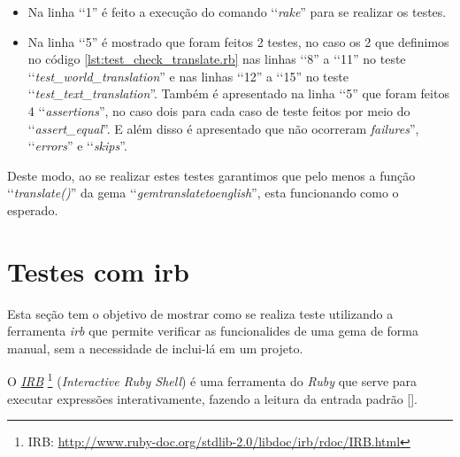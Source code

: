 \begin{itemize}

 \item Na linha ‘‘1'' é feito a execução do comando ‘‘\emph{rake}'' para se realizar os testes.

 \item Na linha ‘‘5'' é mostrado que foram feitos 2 testes, no caso os 2 que definimos no código
 \ref{lst:test_check_translate.rb} nas linhas ‘‘8'' a ‘‘11'' no teste ‘‘\emph{test\_world\_translation}''
 e nas linhas ‘‘12'' a ‘‘15'' no teste ‘‘\emph{test\_text\_translation}''. Também é apresentado na
 linha ‘‘5'' que foram feitos 4 ‘‘\emph{assertions}'', no caso dois para cada caso de teste feitos por
 meio do ‘‘\emph{assert\_equal}''. E além disso é apresentado que não ocorreram  \emph{failures}'',
 ‘‘\emph{errors}'' e ‘‘\emph{skips}''.

\end{itemize}

Deste modo, ao se realizar estes testes garantimos que pelo menos a função ‘‘\emph{translate()}'' da gema
‘‘\emph{gemtranslatetoenglish}'', esta funcionando como o esperado.


\section{Testes com irb}
\label{section:teste_com_irb}


Esta seção tem o objetivo de mostrar como se realiza teste utilizando a ferramenta \emph{irb} que permite
verificar as funcionalides de uma gema de forma manual, sem a necessidade de inclui-lá em um projeto.

O \emph{\href{http://www.ruby-doc.org/stdlib-2.0/libdoc/irb/rdoc/IRB.html}{IRB}} 
\footnote{IRB: \url{http://www.ruby-doc.org/stdlib-2.0/libdoc/irb/rdoc/IRB.html}}
(\emph{Interactive Ruby Shell}) é uma ferramenta do \emph{Ruby} que serve para executar expressões
interativamente, fazendo a leitura da entrada padrão [].

